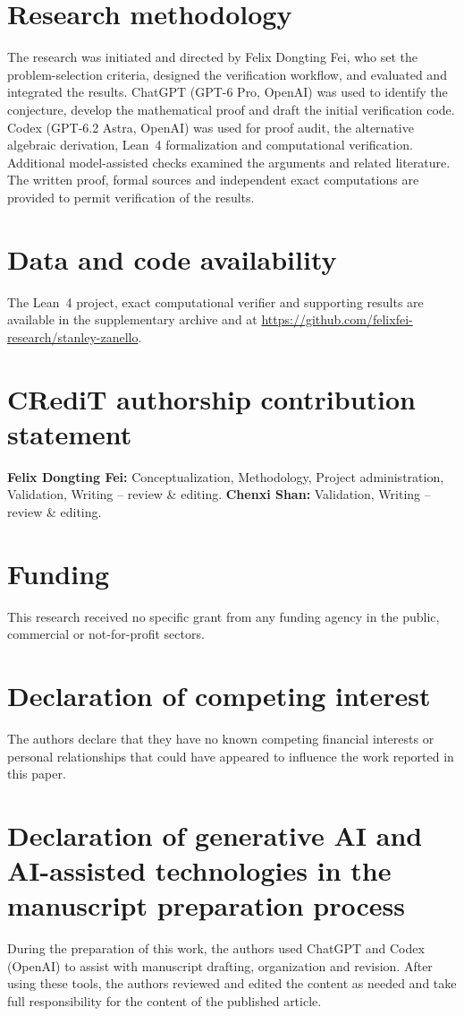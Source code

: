 \documentclass[3p,11pt,number]{elsarticle}
\theoremstyle{remark}
\numberwithin{equation}{section}
\begin{document}
\section{Research methodology}
The research was initiated and directed by Felix Dongting Fei, who set the
problem-selection criteria, designed the verification workflow, and evaluated
and integrated the results. ChatGPT (GPT-6 Pro, OpenAI) was used to identify
the conjecture, develop the mathematical proof and draft the initial
verification code. Codex (GPT-6.2 Astra, OpenAI) was used for proof audit,
the alternative algebraic derivation, Lean~4 formalization and computational
verification. Additional model-assisted checks examined the arguments and
related literature. The written proof, formal sources and independent exact
computations are provided to permit verification of the results.

\section*{Data and code availability}
The Lean~4 project, exact computational verifier and supporting results are
available in the supplementary archive and at
\url{https://github.com/felixfei-research/stanley-zanello}.

\section*{CRediT authorship contribution statement}
\textbf{Felix Dongting Fei:} Conceptualization, Methodology, Project administration,
Validation, Writing -- review \& editing.
\textbf{Chenxi Shan:} Validation, Writing -- review \& editing.

\section*{Funding}
This research received no specific grant from any funding agency in the
public, commercial or not-for-profit sectors.

\section*{Declaration of competing interest}
The authors declare that they have no known competing financial interests
or personal relationships that could have appeared to influence the work
reported in this paper.

\section*{Declaration of generative AI and AI-assisted technologies in the manuscript preparation process}
During the preparation of this work, the authors used ChatGPT and Codex
(OpenAI) to assist with manuscript drafting, organization and revision.
After using these tools, the authors reviewed and edited the content as
needed and take full responsibility for the content of the published article.
\end{document}
